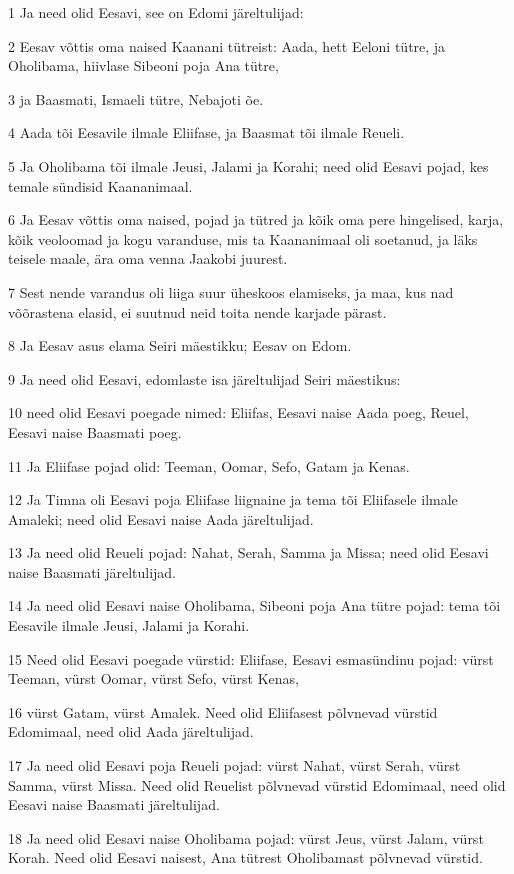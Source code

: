 \par 1 Ja need olid Eesavi, see on Edomi järeltulijad:
\par 2 Eesav võttis oma naised Kaanani tütreist: Aada, hett Eeloni tütre, ja Oholibama, hiivlase Sibeoni poja Ana tütre,
\par 3 ja Baasmati, Ismaeli tütre, Nebajoti õe.
\par 4 Aada tõi Eesavile ilmale Eliifase, ja Baasmat tõi ilmale Reueli.
\par 5 Ja Oholibama tõi ilmale Jeusi, Jalami ja Korahi; need olid Eesavi pojad, kes temale sündisid Kaananimaal.
\par 6 Ja Eesav võttis oma naised, pojad ja tütred ja kõik oma pere hingelised, karja, kõik veoloomad ja kogu varanduse, mis ta Kaananimaal oli soetanud, ja läks teisele maale, ära oma venna Jaakobi juurest.
\par 7 Sest nende varandus oli liiga suur üheskoos elamiseks, ja maa, kus nad võõrastena elasid, ei suutnud neid toita nende karjade pärast.
\par 8 Ja Eesav asus elama Seiri mäestikku; Eesav on Edom.
\par 9 Ja need olid Eesavi, edomlaste isa järeltulijad Seiri mäestikus:
\par 10 need olid Eesavi poegade nimed: Eliifas, Eesavi naise Aada poeg, Reuel, Eesavi naise Baasmati poeg.
\par 11 Ja Eliifase pojad olid: Teeman, Oomar, Sefo, Gatam ja Kenas.
\par 12 Ja Timna oli Eesavi poja Eliifase liignaine ja tema tõi Eliifasele ilmale Amaleki; need olid Eesavi naise Aada järeltulijad.
\par 13 Ja need olid Reueli pojad: Nahat, Serah, Samma ja Missa; need olid Eesavi naise Baasmati järeltulijad.
\par 14 Ja need olid Eesavi naise Oholibama, Sibeoni poja Ana tütre pojad: tema tõi Eesavile ilmale Jeusi, Jalami ja Korahi.
\par 15 Need olid Eesavi poegade vürstid: Eliifase, Eesavi esmasündinu pojad: vürst Teeman, vürst Oomar, vürst Sefo, vürst Kenas,
\par 16 vürst Gatam, vürst Amalek. Need olid Eliifasest põlvnevad vürstid Edomimaal, need olid Aada järeltulijad.
\par 17 Ja need olid Eesavi poja Reueli pojad: vürst Nahat, vürst Serah, vürst Samma, vürst Missa. Need olid Reuelist põlvnevad vürstid Edomimaal, need olid Eesavi naise Baasmati järeltulijad.
\par 18 Ja need olid Eesavi naise Oholibama pojad: vürst Jeus, vürst Jalam, vürst Korah. Need olid Eesavi naisest, Ana tütrest Oholibamast põlvnevad vürstid.
